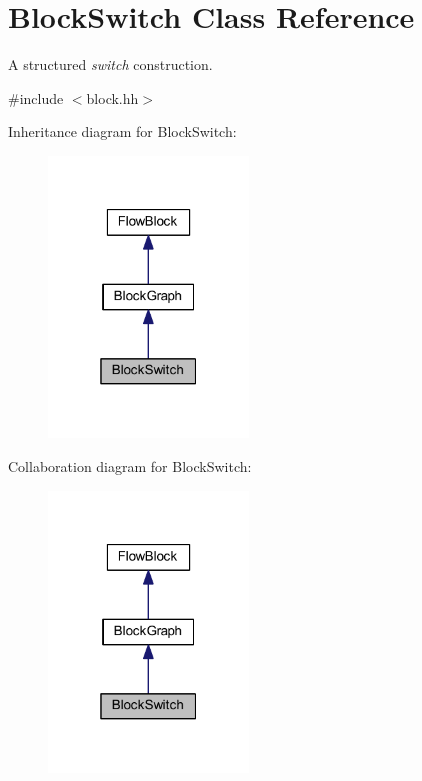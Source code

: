 \hypertarget{class_block_switch}{}\section{Block\+Switch Class Reference}
\label{class_block_switch}


A structured {\itshape switch} construction.  




{\ttfamily \#include $<$block.\+hh$>$}



Inheritance diagram for Block\+Switch\+:
\nopagebreak
\begin{figure}[H]
\begin{center}
\leavevmode
\includegraphics[width=151pt]{class_block_switch__inherit__graph}
\end{center}
\end{figure}


Collaboration diagram for Block\+Switch\+:
\nopagebreak
\begin{figure}[H]
\begin{center}
\leavevmode
\includegraphics[width=151pt]{class_block_switch__coll__graph}
\end{center}
\end{figure}
